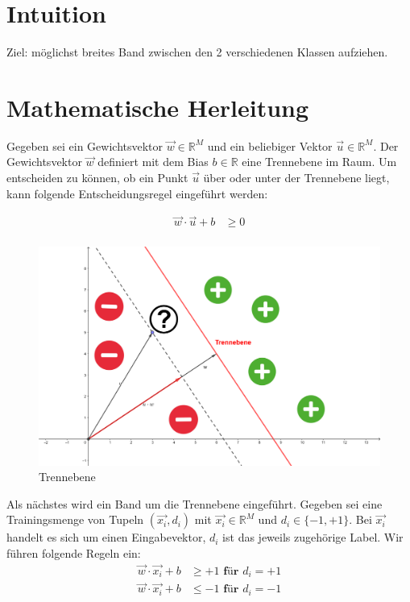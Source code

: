 \documentclass[a4paper,11pt,twoside]{scrreprt}
\begin{document}
\section{Intuition}
Ziel: möglichst breites Band zwischen den 2 verschiedenen Klassen aufziehen.

\section{Mathematische Herleitung}
Gegeben sei ein Gewichtsvektor $\vec{w} \in \mathbb{R}^{M}$ und ein beliebiger Vektor $\vec{u} \in \mathbb{R}^{M}$. Der Gewichtsvektor $\vec{w}$ definiert mit dem Bias $b \in \mathbb{R}$ eine Trennebene im Raum. Um entscheiden zu können, ob ein Punkt $\vec{u}$ über oder unter der Trennebene liegt, kann folgende Entscheidungsregel eingeführt werden:

\begin{equation} \label{dec_rule}
    \begin{aligned}
    \vec{w} \cdot \vec{u} + b & \geq 0 \\
    \end{aligned}
\end{equation}


\begin{figure}[H]
	\centering
	\includegraphics{assets/trennebene.png}
	\caption{Trennebene}
	\label{fig:trennebene}
\end{figure}


Als nächstes wird ein Band um die Trennebene eingeführt. Gegeben sei eine Trainingsmenge von Tupeln $(\vec{x_{i}}, d_{i})$ mit $\vec{x_{i}} \in \mathbb{R}^{M}$ und $d_{i} \in \{-1, +1\}$. Bei $\vec{x_{i}}$ handelt es sich um einen Eingabevektor, $d_{i}$ ist das jeweils zugehörige Label. Wir führen folgende Regeln ein:
\begin{equation} \label{band_rules}
    \begin{aligned}
    \vec{w} \cdot \vec{x_{i}} + b & \geq +1 \textbf{ für $d_{i} = +1$} \\
    \vec{w} \cdot \vec{x_{i}} + b & \leq -1 \textbf{ für $d_{i} = -1$}
    \end{aligned}
\end{equation}
\end{document}
